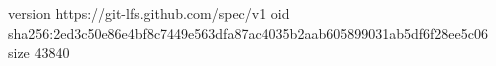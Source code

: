 version https://git-lfs.github.com/spec/v1
oid sha256:2ed3c50e86e4bf8c7449e563dfa87ac4035b2aab605899031ab5df6f28ee5c06
size 43840
